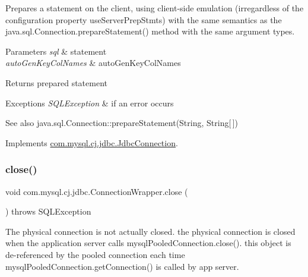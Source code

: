 Prepares a statement on the client, using client-\/side emulation (irregardless of the configuration property \textquotesingle{}use\+Server\+Prep\+Stmts\textquotesingle{}) with the same semantics as the java.\+sql.\+Connection.\+prepare\+Statement() method with the same argument types.


\begin{DoxyParams}{Parameters}
{\em sql} & statement \\
\hline
{\em auto\+Gen\+Key\+Col\+Names} & auto\+Gen\+Key\+Col\+Names \\
\hline
\end{DoxyParams}
\begin{DoxyReturn}{Returns}
prepared statement 
\end{DoxyReturn}

\begin{DoxyExceptions}{Exceptions}
{\em S\+Q\+L\+Exception} & if an error occurs\\
\hline
\end{DoxyExceptions}
\begin{DoxySeeAlso}{See also}
java.\+sql.\+Connection\+::prepare\+Statement(\+String, String\mbox{[}$\,$\mbox{]}) 
\end{DoxySeeAlso}


Implements \mbox{\hyperlink{interfacecom_1_1mysql_1_1cj_1_1jdbc_1_1_jdbc_connection_a46a218367bb0a386a18caed711142d7a}{com.\+mysql.\+cj.\+jdbc.\+Jdbc\+Connection}}.

\mbox{\label{classcom_1_1mysql_1_1cj_1_1jdbc_1_1_connection_wrapper_a1513ad5e208ca46ac61ab5359590a0b9}} 
\subsubsection{\texorpdfstring{close()}{close()}\hspace{0.1cm}{\footnotesize\ttfamily [1/2]}}
{\footnotesize\ttfamily void com.\+mysql.\+cj.\+jdbc.\+Connection\+Wrapper.\+close (\begin{DoxyParamCaption}{ }\end{DoxyParamCaption}) throws S\+Q\+L\+Exception}

The physical connection is not actually closed. the physical connection is closed when the application server calls mysql\+Pooled\+Connection.\+close(). this object is de-\/referenced by the pooled connection each time mysql\+Pooled\+Connection.\+get\+Connection() is called by app server.



